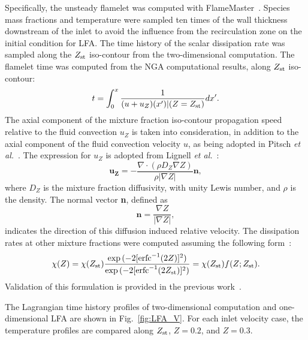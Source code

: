 \documentclass[review,3p,times]{elsarticle}
\begin{document}
\textcolor{dl}{Specifically, the unsteady flamelet was computed with FlameMaster~\cite{flamemaster}.  Species mass fractions and temperature were sampled ten times of the wall thickness downstream of the inlet to avoid the influence from the recirculation zone on the initial condition for LFA.  The time history of the scalar dissipation rate was sampled along the $Z_{\rm st}$ iso-contour from the two-dimensional computation.  The flamelet time was computed from the NGA computational results, along $Z_{\rm st}$ iso-contour: 
 \begin{equation} \label{eq:t}
t = \int ^{x}_{0} \frac{1}{(u + u_Z)(x')|(Z=Z_{\rm st})} dx'.
\end{equation} 
The axial component of the mixture fraction iso-contour propagation speed relative to the fluid convection $u_Z$ is taken into consideration, in addition to the axial component of the fluid convection velocity $u$, as being adopted in Pitsch \emph {et al.}~\cite{pitsch98a}.  The expression for $u_Z$ is adopted from Lignell \emph {et al.}~\cite{lignell07}:
\begin{equation}
\mathbf{u_Z} = -\frac{\nabla \cdot (\rho D_Z \nabla Z) }{\rho |\nabla Z|} \mathbf{n},
\end{equation}
where $D_Z$ is the mixture fraction diffusivity, with unity Lewis number, and $\rho$ is the density.  The normal vector \textbf{n}, defined as
\begin{equation}
\mathbf{n} = \frac{\nabla Z}{|\nabla Z|},
\end{equation}
indicates the direction of this diffusion induced relative velocity.  The dissipation rates at other mixture fractions were computed assuming the following form~\cite{petersbook}:
\begin{equation} \label{eq:Zref}
\chi{(Z)} = \chi{(Z_{\rm st})} \frac{\exp{(-2[{\rm erfc}^{-1}(2Z)]^2)}}{\exp{(-2[{\rm erfc}^{-1}(2Z_{\rm st})]^2)}} = \chi{(Z_{\rm st})} f(Z;Z_{\rm st}).
\end{equation}
Validation of this formulation is provided in the previous work~\cite{deng15}.}

The Lagrangian time history profiles of two-dimensional computation and one-dimensional LFA are shown in Fig.~\ref{fig:LFA_V}.  For each inlet velocity case, the temperature profiles are compared along $Z_{\rm st}$, $Z = 0.2$, and $Z = 0.3$.
\end{document}

